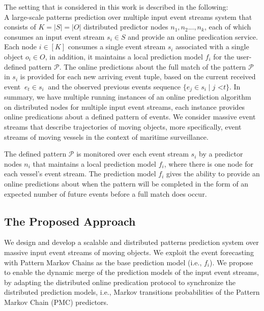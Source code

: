\par The setting that is considered in this work is described in the following:\\
A large-scale patterns prediction over multiple input event streams system that  consists of $K=\left\vert{S}\right\vert=\left\vert{O}\right\vert$ distributed predictor nodes $n_1,n_2...,n_k$, each of which consumes an input event stream $s_i\in S$ and provide an online predication service. Each node $i \in [K]$ consumes a single event stream $s_i$ associated with a single object $o_i \in O$, in addition,  it  maintains a local prediction model $f_i$ for the user-defined pattern $\mathcal{P}$. The online predictions about the full match of  the pattern $\mathcal{P}$ in $s_i$ is provided for each new arriving event tuple, based on the current received event $ \ e_t \in s_i \ $ and the observed previous events sequence $\{e_j \in s_i \mid  j \text{ <} t\}$. In summary, we have multiple running instances of an online prediction algorithm on distributed nodes for multiple input event streams, each instance  provides online predications about a defined pattern of events.  We consider massive event streams that describe trajectories of  moving objects, more specifically, event streams of moving vessels in the context of maritime surveillance.  

The defined pattern $\mathcal{P}$ is monitored over each event stream $s_i$  by a  predictor nodes  $n_i$  that maintains a local prediction model $f_i$, where there is one node for each vessel's event stream.  The prediction model $f_i$ gives the ability to provide an online predictions about when the pattern will be completed in the form of an expected number of future events before a full match does occur.

\subsection{The Proposed Approach}
\par We design and develop a scalable and distributed patterns prediction system over massive input event streams of moving objects. We  exploit the event forecasting with Pattern Markov Chains \cite{alevizos2017event} as the base prediction model (i.e., $f_i$). We propose to enable the dynamic merge of the prediction models of the input event streams, by adapting the distributed online predication protocol \cite{dekel2012optimal,kamp2014communication} to synchronize the distributed  prediction models, i.e., Markov transitions probabilities of the Pattern Markov Chain (PMC) predictors.

